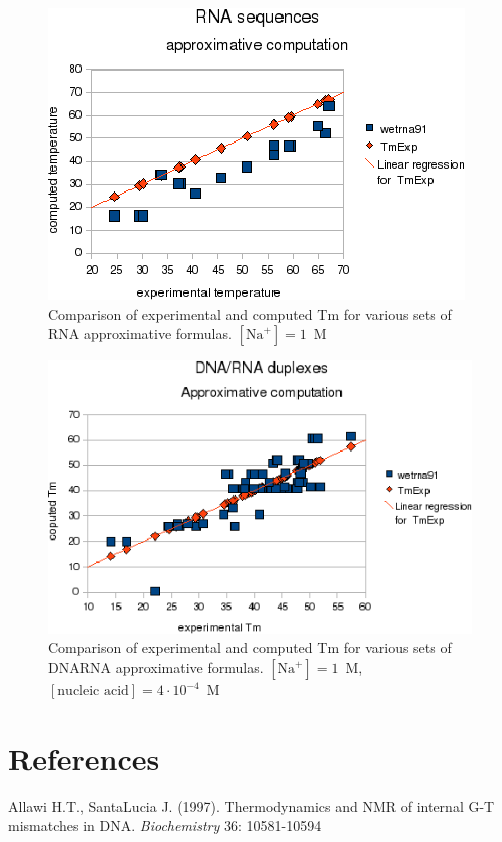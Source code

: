 \documentclass{article}
\begin{document}
\begin{figure}[h]
\includegraphics[width=1\linewidth]{images/RNAApproximativeMode}
\caption{Comparison of experimental and computed Tm for various sets of
 RNA approximative formulas. $[\mbox{Na}^+] = 1$~M}
\end{figure}

\begin{figure}[h]
\includegraphics[width=1\linewidth]{images/DNARNAApproximativeMode}
\caption{Comparison of experimental and computed Tm for various sets of
 DNARNA approximative formulas. $[\mbox{Na}^+] = 1$~M, $[\mbox{nucleic acid}] = 4\cdot{}10^{-4}$~M}
\end{figure}      
 
\clearpage     
\section{References }
Allawi H.T., SantaLucia J. (1997). Thermodynamics and NMR of internal G-T mismatches 
in DNA. \textit{Biochemistry}  36: 10581-10594   
\end{document}
